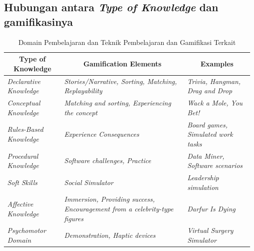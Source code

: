\subsection{Hubungan antara \textit{Type of Knowledge} dan gamifikasinya}
 \begin{table}[H]
	\caption{Domain Pembelajaran dan Teknik Pembelajaran dan Gamifikasi Terkait \cite{kapp2012gamification}}
	\vspace{0.5em}
	\centering
	\begin{tabular}{|m{5cm}|m{5cm}|m{4cm}|}
		\hline
        \multicolumn{1}{|c|}{\textbf{Type of Knowledge}} & \multicolumn{1}{c|}{\textbf{Gamification Elements}} & \multicolumn{1}{c|}{\textbf{Examples}} \\ 
		\hline 
        \hline
		\textit{Declarative Knowledge} & \textit{Stories/Narrative, Sorting, Matching, Replayability} & \textit{Trivia, Hangman, Drag and Drop }\\\hline
		\textit{Conceptual Knowledge} & \textit{Matching and sorting, Experiencing the concept}  & \textit{Wack a Mole, You Bet!} \\\hline
		\textit{Rules-Based Knowledge}  & \textit{Experience Consequences}  & \textit{Board games, Simulated work tasks} \\ \hline
        \textit{Procedural Knowledge } & \textit{Software challenges, Practice} & \textit{Data Miner, Software scenarios} \\\hline
        \textit{Soft Skills} & \textit{Social Simulator}  & \textit{Leadership simulation}  \\\hline
        \textit{Affective Knowledge} & \textit{Immersion, Providing success, Encouragement from a celebrity-type figures } & \textit{Darfur Is Dying}  \\\hline
        \textit{Psychomotor Domain} & \textit{Demonstration, Haptic devices}  & \textit{Virtual Surgery Simulator}  \\
        \hline
	\end{tabular}
	\label{Tab: Tabel Type of Knowledge and Gamification}
\end{table}
